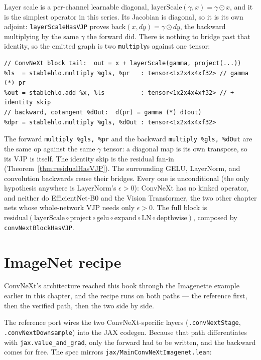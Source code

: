 Layer scale is a per-channel learnable diagonal,
$\mathrm{layerScale}(\gamma, x) = \gamma \odot x$, and it is the simplest
operator in this series. Its Jacobian is diagonal, so it is its own adjoint:
\texttt{layerScaleHasVJP} proves $\mathrm{back}(x, dy) = \gamma \odot dy$,
the backward multiplying by the same $\gamma$ the forward did. There is
nothing to bridge past that identity, so the emitted graph is two
\texttt{multiply}s against one tensor:

\begin{verbatim}
// ConvNeXt block tail:  out = x + layerScale(gamma, project(...))
%ls  = stablehlo.multiply %gls, %pr   : tensor<1x2x4x4xf32> // gamma (*) pr
%out = stablehlo.add %x, %ls          : tensor<1x2x4x4xf32> // + identity skip
// backward, cotangent %dOut:  d(pr) = gamma (*) d(out)
%dpr = stablehlo.multiply %gls, %dOut : tensor<1x2x4x4xf32>
\end{verbatim}

\noindent The forward \texttt{multiply \%gls, \%pr} and the backward
\texttt{multiply \%gls, \%dOut} are the same op against the same $\gamma$
tensor: a diagonal map is its own transpose, so its VJP is itself. The identity skip is the residual fan-in (Theorem~\ref{thm:residualHasVJP}). The
surrounding GELU, LayerNorm, and convolution backwards reuse their bridges.
Every one is unconditional (the only hypothesis anywhere is LayerNorm's
$\epsilon > 0$): ConvNeXt has no kinked operator, and neither do
EfficientNet-B0 and the Vision Transformer, the two other chapter nets whose
whole-network VJP needs only $\epsilon > 0$. The full block is
$\mathrm{residual}(\mathrm{layerScale} \circ \mathrm{project} \circ
\mathrm{gelu} \circ \mathrm{expand} \circ \mathrm{LN} \circ
\mathrm{depthwise})$, composed by \texttt{convNextBlockHasVJP}.

\section{ImageNet recipe}

\label{sec:convnext_imagenet}

ConvNeXt's architecture reached this book through the Imagenette
example earlier in this chapter, and the recipe runs on both paths ---
the reference first, then the verified path, then the two side by side.


The reference port wires the two ConvNeXt-specific layers
(\texttt{.convNextStage}, \texttt{.convNextDownsample}) into the JAX
codegen. Because that path differentiates with
\texttt{jax.value\_and\_grad}, only the forward had to be written, and
the backward comes for free. The spec mirrors
\texttt{jax/MainConvNeXtImagenet.lean}:

